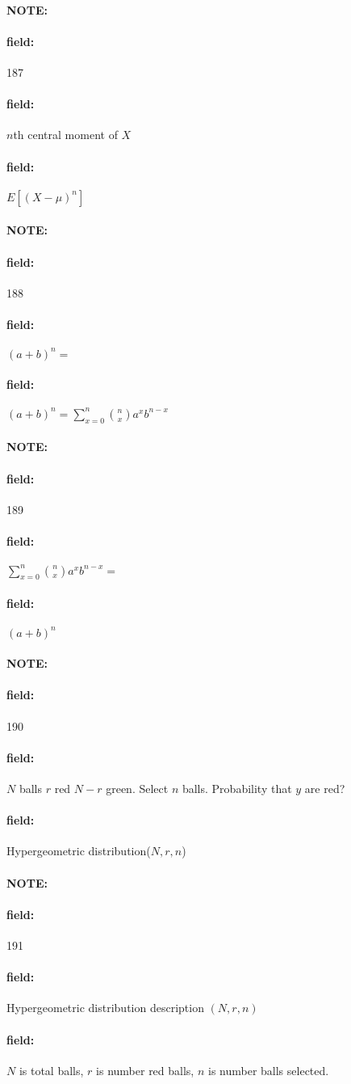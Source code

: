 \documentclass[12pt]{article}
\newenvironment{note}{\paragraph{NOTE:}}{}
\newenvironment{field}{\paragraph{field:}}{}
\begin{document}
\begin{note} \begin{field} \tiny 187 \end{field}
  \begin{field}
    $n$th central moment of $X$
  \end{field}
  \begin{field}
    $E[(X - \mu)^n]$
  \end{field}
\end{note}

\begin{note} \begin{field} \tiny 188 \end{field}
  \begin{field}
    $(a + b)^n = $
  \end{field}
  \begin{field}
    $(a + b)^n = \sum_{x = 0}^n \binom{n}{x}a^xb^{n-x}$
  \end{field}
\end{note}

\begin{note} \begin{field} \tiny 189 \end{field}
  \begin{field}
    $\sum_{x = 0}^n \binom{n}{x}a^xb^{n-x} = $
  \end{field}
  \begin{field}
    $(a + b)^n$
  \end{field}
\end{note}

\begin{note} \begin{field} \tiny 190 \end{field}
  \begin{field}
    $N$ balls $r$ red $N - r$ green. Select $n$ balls. Probability that $y$ are red?
  \end{field}
  \begin{field}
    Hypergeometric distribution($N,r,n$)
  \end{field}
\end{note}

\begin{note} \begin{field} \tiny 191 \end{field}
  \begin{field}
    Hypergeometric distribution description $(N,r,n)$
  \end{field}
  \begin{field}
    $N$ is total balls, $r$ is number red balls, $n$ is number balls selected.
  \end{field}
\end{note}
\end{document}

